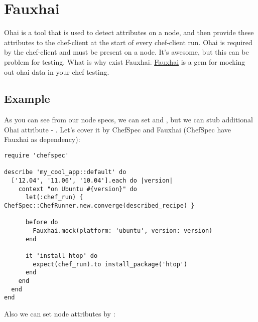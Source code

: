 \section{Fauxhai}
\label{sec:testing-fauxhai}

Ohai is a tool that is used to detect attributes on a node, and then provide these attributes to the chef-client at the start of every chef-client run. Ohai is required by the chef-client and must be present on a node. It's awesome, but this can be problem for testing. What is why exist Fauxhai. \href{http://technology.customink.com/fauxhai/}{Fauxhai} is a gem for mocking out ohai data in your chef testing.

\subsection{Example}

As you can see from our node specs, we can set  and , but we can stub additional Ohai attribute - . Let's cover it by ChefSpec and Fauxhai (ChefSpec have Fauxhai as dependency):

\begin{lstlisting}[label=lst:testing-fauxhai1]
require 'chefspec'

describe 'my_cool_app::default' do
  ['12.04', '11.06', '10.04'].each do |version|
    context "on Ubuntu #{version}" do
      let(:chef_run) { ChefSpec::ChefRunner.new.converge(described_recipe) }

      before do
        Fauxhai.mock(platform: 'ubuntu', version: version)
      end

      it 'install htop' do
        expect(chef_run).to install_package('htop')
      end
    end
  end
end
\end{lstlisting}

Also we can set node attributes by :

